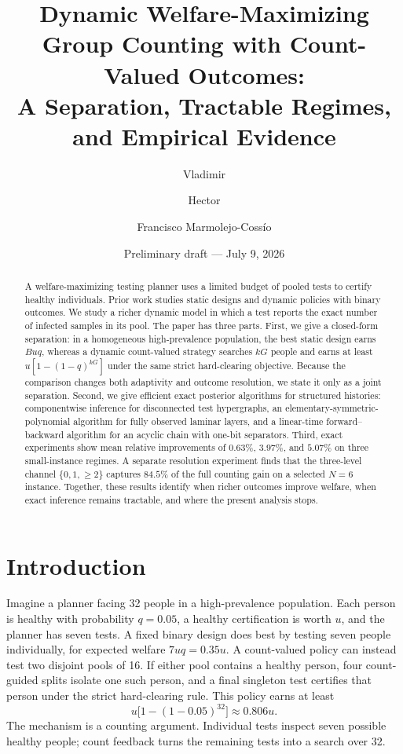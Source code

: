 \documentclass[11pt]{article}
\title{\textbf{Dynamic Welfare-Maximizing Group Counting with Count-Valued Outcomes:}\\
A Separation, Tractable Regimes, and Empirical Evidence}
\author{Vladimir \and Hector \and Francisco Marmolejo-Coss\'io}
\date{Preliminary draft --- July 9, 2026}
\begin{document}
\maketitle

\begin{abstract}
A welfare-maximizing testing planner uses a limited budget of pooled tests to
certify healthy individuals. Prior work studies static designs and dynamic
policies with binary outcomes. We study a richer dynamic model in which a test
reports the exact number of infected samples in its pool. The paper has three
parts. First, we give a closed-form separation: in a homogeneous high-prevalence
population, the best static design earns $Buq$, whereas a dynamic count-valued
strategy searches $kG$ people and earns at least
$u[1-(1-q)^{kG}]$ under the same strict hard-clearing objective. Because the
comparison changes both adaptivity and outcome resolution, we state it only as
a joint separation.
Second, we give efficient exact posterior algorithms for structured histories:
componentwise inference for disconnected test hypergraphs, an
elementary-symmetric-polynomial algorithm for fully observed laminar layers,
and a linear-time forward--backward algorithm for an acyclic chain with
one-bit separators. Third, exact experiments show mean relative improvements
of $0.63\%$, $3.97\%$, and $5.07\%$ on three small-instance regimes. A separate
resolution experiment finds that the
three-level channel $\{0,1,\geq2\}$ captures $84.5\%$ of the full counting gain
on a selected $N=6$ instance. Together, these results identify when richer
outcomes improve welfare, when exact inference remains tractable, and where the
present analysis stops.
\end{abstract}

\section{Introduction}

Imagine a planner facing 32 people in a high-prevalence population. Each person
is healthy with probability $q=0.05$, a healthy certification is worth $u$, and
the planner has seven tests. A fixed binary design does best by testing seven
people individually, for expected welfare $7uq=0.35u$. A count-valued policy can
instead test two disjoint pools of 16. If either pool contains a healthy person,
four count-guided splits isolate one such person, and a final singleton test
certifies that person under the strict hard-clearing rule. This policy earns at
least
\[
  u\bigl[1-(1-0.05)^{32}\bigr] \approx 0.806u.
\]
The mechanism is a counting argument. Individual tests inspect seven possible
healthy people; count feedback turns the remaining tests into a search over 32.
\end{document}
